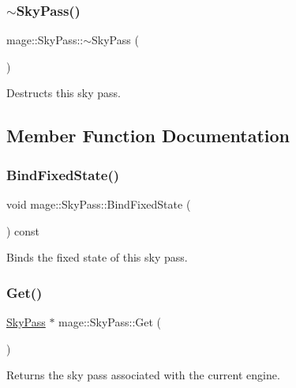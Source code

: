 \subsubsection{\texorpdfstring{$\sim$\+Sky\+Pass()}{~SkyPass()}}
{\footnotesize\ttfamily mage\+::\+Sky\+Pass\+::$\sim$\+Sky\+Pass (\begin{DoxyParamCaption}{ }\end{DoxyParamCaption})\hspace{0.3cm}{\ttfamily [default]}}

Destructs this sky pass. 

\subsection{Member Function Documentation}
\hypertarget{classmage_1_1_sky_pass_aa74c5e32a917aac610b2c7e4750c4639}{}\label{classmage_1_1_sky_pass_aa74c5e32a917aac610b2c7e4750c4639} 
\subsubsection{\texorpdfstring{Bind\+Fixed\+State()}{BindFixedState()}}
{\footnotesize\ttfamily void mage\+::\+Sky\+Pass\+::\+Bind\+Fixed\+State (\begin{DoxyParamCaption}{ }\end{DoxyParamCaption}) const\hspace{0.3cm}{\ttfamily [noexcept]}}

Binds the fixed state of this sky pass. \hypertarget{classmage_1_1_sky_pass_af608935f6cb4b631512ee9c9eb6dec9d}{}\label{classmage_1_1_sky_pass_af608935f6cb4b631512ee9c9eb6dec9d} 
\subsubsection{\texorpdfstring{Get()}{Get()}}
{\footnotesize\ttfamily \hyperlink{classmage_1_1_sky_pass}{Sky\+Pass} $\ast$ mage\+::\+Sky\+Pass\+::\+Get (\begin{DoxyParamCaption}{ }\end{DoxyParamCaption})\hspace{0.3cm}{\ttfamily [static]}}

Returns the sky pass associated with the current engine.

